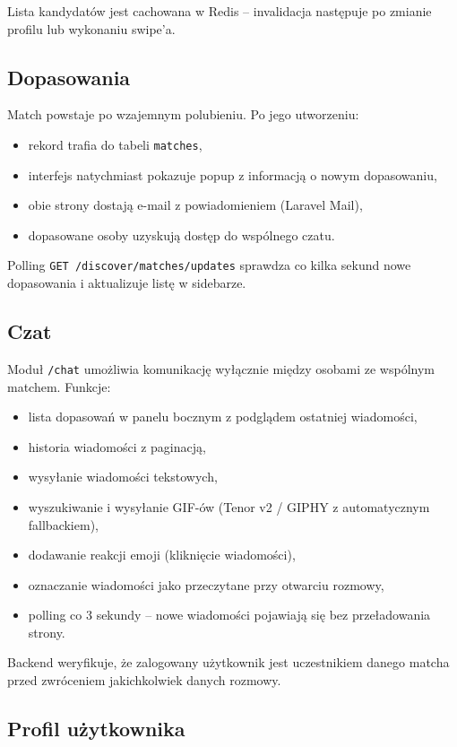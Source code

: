 \documentclass[12pt,a4paper]{article}
\begin{document}
Lista kandydatów jest cachowana w Redis -- invalidacja następuje po zmianie profilu lub wykonaniu swipe'a.

\subsection{Dopasowania}

Match powstaje po wzajemnym polubieniu. Po jego utworzeniu:
\begin{itemize}
    \item rekord trafia do tabeli \texttt{matches},
    \item interfejs natychmiast pokazuje popup z informacją o nowym dopasowaniu,
    \item obie strony dostają e-mail z powiadomieniem (Laravel Mail),
    \item dopasowane osoby uzyskują dostęp do wspólnego czatu.
\end{itemize}

Polling \texttt{GET /discover/matches/updates} sprawdza co kilka sekund nowe dopasowania i aktualizuje listę w sidebarze.

\subsection{Czat}

Moduł \texttt{/chat} umożliwia komunikację wyłącznie między osobami ze wspólnym matchem. Funkcje:
\begin{itemize}
    \item lista dopasowań w panelu bocznym z podglądem ostatniej wiadomości,
    \item historia wiadomości z paginacją,
    \item wysyłanie wiadomości tekstowych,
    \item wyszukiwanie i wysyłanie GIF-ów (Tenor v2 / GIPHY z automatycznym fallbackiem),
    \item dodawanie reakcji emoji (kliknięcie wiadomości),
    \item oznaczanie wiadomości jako przeczytane przy otwarciu rozmowy,
    \item polling co 3 sekundy -- nowe wiadomości pojawiają się bez przeładowania strony.
\end{itemize}

Backend weryfikuje, że zalogowany użytkownik jest uczestnikiem danego matcha przed zwróceniem jakichkolwiek danych rozmowy.

\subsection{Profil użytkownika}
\end{document}
